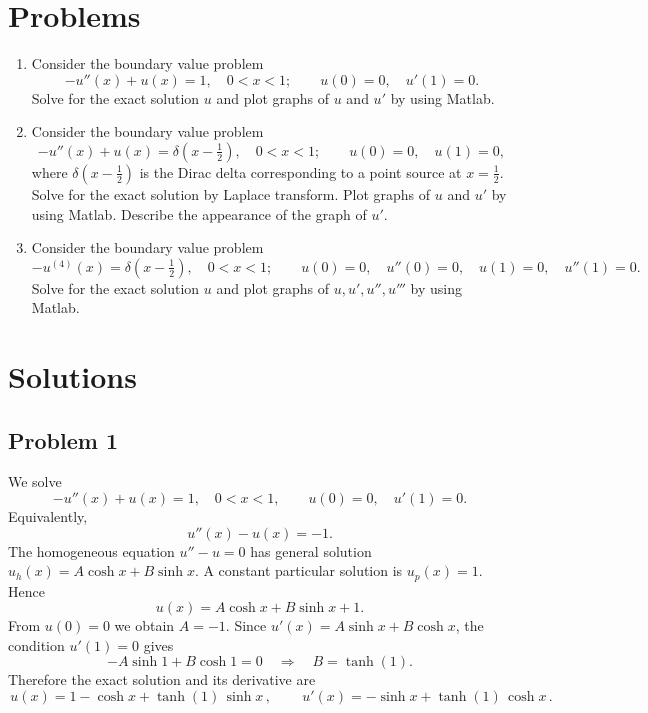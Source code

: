 \documentclass[12pt, a4paper]{article}
\begin{document}
\newpage
\section*{Problems}

\begin{enumerate}[leftmargin=1.2em,label=\arabic*.]
  \item Consider the boundary value problem
  \[
    -u''(x) + u(x) = 1,\quad 0<x<1;\qquad u(0)=0,\quad u'(1)=0.
  \]
  Solve for the exact solution \(u\) and plot graphs of \(u\) and \(u'\) by using Matlab.

  \item Consider the boundary value problem
  \[
    -u''(x) + u(x) = \delta\!\left(x-\tfrac{1}{2}\right),\quad 0<x<1;\qquad
    u(0)=0,\quad u(1)=0,
  \]
  where \(\delta(x-\tfrac{1}{2})\) is the Dirac delta corresponding to a point source at \(x=\tfrac{1}{2}\).
  Solve for the exact solution by Laplace transform. Plot graphs of \(u\) and \(u'\) by using Matlab. Describe the appearance of the graph of \(u'\).

  \item Consider the boundary value problem
  \[
    -u^{(4)}(x)=\delta\!\left(x-\tfrac{1}{2}\right),\quad 0<x<1;\qquad
    u(0)=0,\quad u''(0)=0,\quad u(1)=0,\quad u''(1)=0.
  \]
  Solve for the exact solution \(u\) and plot graphs of \(u,u',u'',u'''\) by using Matlab.
\end{enumerate}

\newpage
\section*{Solutions}

\subsection*{Problem 1}

We solve
\[
-u''(x)+u(x)=1,\quad 0<x<1,\qquad u(0)=0,\quad u'(1)=0.
\]
Equivalently,
\[
u''(x)-u(x)=-1.
\]
The homogeneous equation \(u''-u=0\) has general solution \(u_h(x)=A\cosh x+B\sinh x\).
A constant particular solution is \(u_p(x)=1\).
Hence
\[
u(x)=A\cosh x+B\sinh x+1.
\]
From \(u(0)=0\) we obtain \(A=-1\).
Since \(u'(x)=A\sinh x+B\cosh x\), the condition \(u'(1)=0\) gives
\[
-A\sinh 1 + B\cosh 1 = 0 \quad\Rightarrow\quad B=\tanh(1).
\]
Therefore the exact solution and its derivative are
\[
\boxed{\,u(x)=1-\cosh x+\tanh(1)\,\sinh x\,},\qquad
\boxed{\,u'(x)=-\sinh x+\tanh(1)\,\cosh x\,}.
\]
\end{document}
